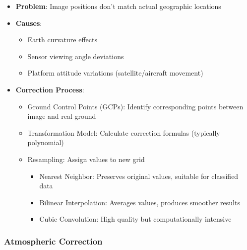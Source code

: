 \documentclass[
  letterpaper,
]{scrbook}
\providecommand{\tightlist}{%
  \setlength{\itemsep}{0pt}\setlength{\parskip}{0pt}}\usepackage{longtable,booktabs,array}
\begin{document}
\begin{itemize}
\tightlist
\item
  \textbf{Problem}: Image positions don't match actual geographic
  locations
\item
  \textbf{Causes}:

  \begin{itemize}
  \tightlist
  \item
    Earth curvature effects
  \item
    Sensor viewing angle deviations
  \item
    Platform attitude variations (satellite/aircraft movement)
  \end{itemize}
\item
  \textbf{Correction Process}:

  \begin{itemize}
  \tightlist
  \item
    Ground Control Points (GCPs): Identify corresponding points between
    image and real ground
  \item
    Transformation Model: Calculate correction formulas (typically
    polynomial)
  \item
    Resampling: Assign values to new grid

    \begin{itemize}
    \tightlist
    \item
      Nearest Neighbor: Preserves original values, suitable for
      classified data
    \item
      Bilinear Interpolation: Averages values, produces smoother results
    \item
      Cubic Convolution: High quality but computationally intensive
    \end{itemize}
  \end{itemize}
\end{itemize}

\subsubsection{Atmospheric Correction}\label{atmospheric-correction}
\end{document}
